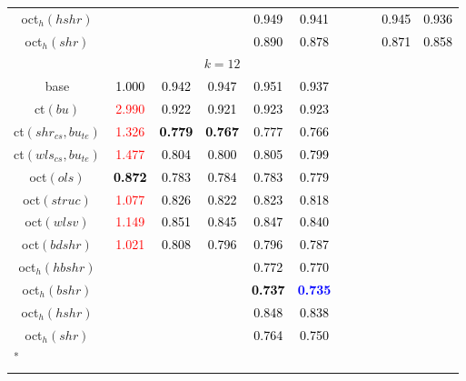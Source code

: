 \begin{tabular}[t]{c|>{}cccc>{}c|ccccc}
oct$_h(hshr)$ &  &  &  & \textcolor{black}{0.949} & \textcolor{black}{0.941} &  &  &  & \textcolor{black}{0.945} & \textcolor{black}{0.936}\\
oct$_h(shr)$ &  &  &  & \textcolor{black}{0.890} & \textcolor{black}{0.878} &  &  &  & \textcolor{black}{0.871} & \textcolor{black}{0.858}\\
\addlinespace[0.3em]
 &  & \\
base & \textcolor{black}{1.000} & \textcolor{black}{0.942} & \textcolor{black}{0.947} & \textcolor{black}{0.951} & \textcolor{black}{0.937} &  &  &  &  & \\
ct$(bu)$ & \textcolor{red}{2.990} & \textcolor{black}{0.922} & \textcolor{black}{0.921} & \textcolor{black}{0.923} & \textcolor{black}{0.923} &  &  &  &  & \\
ct$(shr_{cs}, bu_{te})$ & \textcolor{red}{1.326} & \textcolor{black}{\textbf{0.779}} & \textcolor{black}{\textbf{0.767}} & \textcolor{black}{0.777} & \textcolor{black}{0.766} &  &  &  &  & \\
ct$(wls_{cs}, bu_{te})$ & \textcolor{red}{1.477} & \textcolor{black}{0.804} & \textcolor{black}{0.800} & \textcolor{black}{0.805} & \textcolor{black}{0.799} &  &  &  &  & \\
oct$(ols)$ & \textcolor{black}{\textbf{0.872}} & \textcolor{black}{0.783} & \textcolor{black}{0.784} & \textcolor{black}{0.783} & \textcolor{black}{0.779} &  &  &  &  & \\
oct$(struc)$ & \textcolor{red}{1.077} & \textcolor{black}{0.826} & \textcolor{black}{0.822} & \textcolor{black}{0.823} & \textcolor{black}{0.818} &  &  &  &  & \\
oct$(wlsv)$ & \textcolor{red}{1.149} & \textcolor{black}{0.851} & \textcolor{black}{0.845} & \textcolor{black}{0.847} & \textcolor{black}{0.840} &  &  &  &  & \\
oct$(bdshr)$ & \textcolor{red}{1.021} & \textcolor{black}{0.808} & \textcolor{black}{0.796} & \textcolor{black}{0.796} & \textcolor{black}{0.787} &  &  &  &  & \\
oct$_h(hbshr)$ &  &  &  & \textcolor{black}{0.772} & \textcolor{black}{0.770} &  &  &  &  & \\
oct$_h(bshr)$ &  &  &  & \textcolor{black}{\textbf{0.737}} & \textcolor{blue}{\textbf{0.735}} &  &  &  &  & \\
oct$_h(hshr)$ &  &  &  & \textcolor{black}{0.848} & \textcolor{black}{0.838} &  &  &  &  & \\
oct$_h(shr)$ &  &  &  & \textcolor{black}{0.764} & \textcolor{black}{0.750} &  &  &  &  & \\
\bottomrule
{}\\
\end{tabular}
